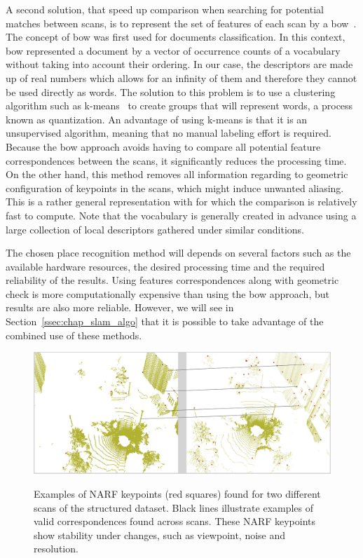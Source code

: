 A second solution, that speed up comparison when searching for potential matches between scans, is to represent the set of features of each scan by a \gls*{bow}~\citep{salton1983mcgill}. The concept of \gls*{bow} was first used for documents classification. In this context, \gls*{bow} represented a document by a vector of occurrence counts of a vocabulary without taking into account their ordering. In our case, the descriptors are made up of real numbers which allows for an infinity of them and therefore they cannot be used directly as words. The solution to this problem is to use a clustering algorithm such as k-means~\citep{MacQueen1967} to create groups that will represent words, a process known as quantization. An advantage of using k-means is that it is an unsupervised algorithm, meaning that no manual labeling effort is required. Because the \gls*{bow} approach avoids having to compare all potential feature correspondences between the scans, it significantly reduces the processing time. On the other hand, this method removes all information regarding to geometric configuration of keypoints in the scans, which might induce unwanted aliasing. This is a rather general representation with for which the comparison is relatively fast to compute. Note that the vocabulary is generally created in advance using a large collection of local descriptors gathered under similar conditions. 

The chosen place recognition method will depends on several factors such as the available hardware resources, the desired processing time and the required reliability of the results. Using features correspondences along with geometric check is more computationally expensive than using the \gls*{bow} approach, but results are also more reliable. However, we will see in Section~\ref{ssec:chap_slam_algo} that it is possible to take advantage of the combined use of these methods. 

\begin{figure}[H]
    \centering
    \includegraphics[width=0.995\linewidth]{img/chap_slam/features_line.png}\\
    \caption{Examples of NARF keypoints (red squares) found for two different scans of the structured dataset. Black lines illustrate examples of valid correspondences found across scans. These NARF keypoints show stability under changes, such as viewpoint, noise and resolution.}
    \label{fig:chap_slam_features_correspondences}
\end{figure}


